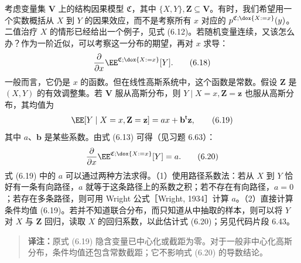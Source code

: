 \begin{example}[线性高斯系统中的调整]
考虑变量集 $\mathbf V$ 上的结构因果模型 $\mathfrak C$，其中 $\{X,Y\},\mathbf Z\subseteq\mathbf V$。有时，我们希望用一个实数概括从 $X$ 到 $Y$ 的因果效应，而不是考察所有 $x$ 对应的 $p^{\mathfrak C;\dox{X:=x}}(y)$。二值治疗 $X$ 的情形已经给出一个例子，见式 (6.12)。若随机变量连续，又该怎么办？作为一阶近似，可以考察这一分布的期望，再对 $x$ 求导：
\begin{equation}
 \frac{\partial}{\partial x}\EE^{\mathfrak C;\dox{X:=x}}[Y].
 \tag{6.18}
\end{equation}
一般而言，它仍是 $x$ 的函数。但在线性高斯系统中，这个函数是常数。假设 $\mathbf Z$ 是 $(X,Y)$ 的有效调整集。若 $\mathbf V$ 服从高斯分布，则 $Y\mid X=x,\mathbf Z=\mathbf z$ 也服从高斯分布，其均值为
\begin{equation}
 \EE[Y\mid X=x,\mathbf Z=\mathbf z]=ax+\mathbf b^{\mathsf t}\mathbf z,
 \tag{6.19}
\end{equation}
其中 $a$、$\mathbf b$ 是某些系数。由式 (6.13) 可得（见习题 6.63）：
\begin{equation}
 \frac{\partial}{\partial x}\EE^{\mathfrak C;\dox{X:=x}}[Y]=a.
 \tag{6.20}
\end{equation}
式 (6.19) 中的 $a$ 可以通过两种方法求得。（1）使用路径系数法：若从 $X$ 到 $Y$ 恰好有一条有向路径，$a$ 就等于这条路径上的系数之积；若不存在有向路径，$a=0$；若存在多条路径，则可用 Wright 公式［Wright, 1934］计算 $a$。（2）直接计算条件均值 (6.19)。若并不知道联合分布，而只知道从中抽取的样本，则可以将 $Y$ 对 $X$ 与 $\mathbf Z$ 回归，读取 $X$ 的回归系数，以此估计式 (6.20)；另见代码片段 6.43。
\end{example}
\begin{quote}\small
\textbf{译注：}原式 (6.19) 隐含变量已中心化或截距为零。对于一般非中心化高斯分布，条件均值还包含常数截距；它不影响式 (6.20) 的导数结论。
\end{quote}

